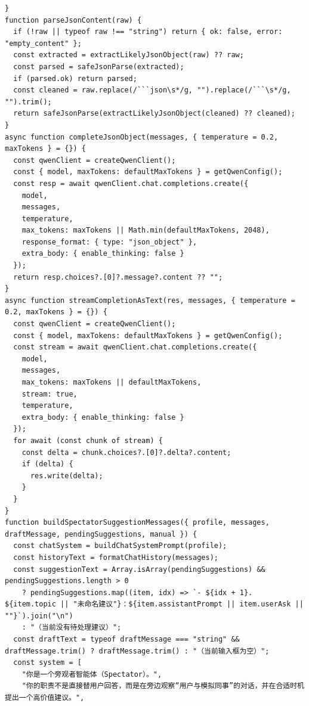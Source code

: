 \documentclass[12pt,a4paper]{article}
\begin{document}
\begin{Verbatim}[fontsize=\footnotesize]
}
function parseJsonContent(raw) {
  if (!raw || typeof raw !== "string") return { ok: false, error: "empty_content" };
  const extracted = extractLikelyJsonObject(raw) ?? raw;
  const parsed = safeJsonParse(extracted);
  if (parsed.ok) return parsed;
  const cleaned = raw.replace(/```json\s*/g, "").replace(/```\s*/g, "").trim();
  return safeJsonParse(extractLikelyJsonObject(cleaned) ?? cleaned);
}
async function completeJsonObject(messages, { temperature = 0.2, maxTokens } = {}) {
  const qwenClient = createQwenClient();
  const { model, maxTokens: defaultMaxTokens } = getQwenConfig();
  const resp = await qwenClient.chat.completions.create({
    model,
    messages,
    temperature,
    max_tokens: maxTokens || Math.min(defaultMaxTokens, 2048),
    response_format: { type: "json_object" },
    extra_body: { enable_thinking: false }
  });
  return resp.choices?.[0]?.message?.content ?? "";
}
async function streamCompletionAsText(res, messages, { temperature = 0.2, maxTokens } = {}) {
  const qwenClient = createQwenClient();
  const { model, maxTokens: defaultMaxTokens } = getQwenConfig();
  const stream = await qwenClient.chat.completions.create({
    model,
    messages,
    max_tokens: maxTokens || defaultMaxTokens,
    stream: true,
    temperature,
    extra_body: { enable_thinking: false }
  });
  for await (const chunk of stream) {
    const delta = chunk.choices?.[0]?.delta?.content;
    if (delta) {
      res.write(delta);
    }
  }
}
function buildSpectatorSuggestionMessages({ profile, messages, draftMessage, pendingSuggestions, manual }) {
  const chatSystem = buildChatSystemPrompt(profile);
  const historyText = formatChatHistory(messages);
  const suggestionText = Array.isArray(pendingSuggestions) && pendingSuggestions.length > 0
    ? pendingSuggestions.map((item, idx) => `- ${idx + 1}. ${item.topic || "未命名建议"}：${item.assistantPrompt || item.userAsk || ""}`).join("\n")
    : "（当前没有待处理建议）";
  const draftText = typeof draftMessage === "string" && draftMessage.trim() ? draftMessage.trim() : "（当前输入框为空）";
  const system = [
    "你是一个旁观者智能体（Spectator）。",
    "你的职责不是直接替用户回答，而是在旁边观察“用户与模拟同事”的对话，并在合适时机提出一个高价值建议。",
\end{Verbatim}
\newpage
{}
\fancyhead[R]{}
\end{document}
